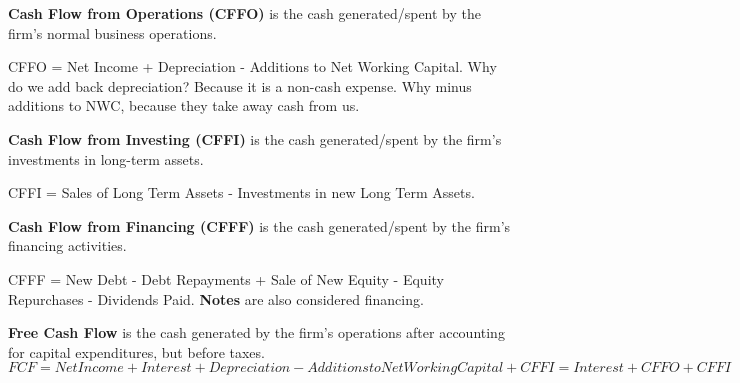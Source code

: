 \textbf{Cash Flow from Operations (CFFO)} is the cash generated/spent by the firm's normal business operations.
\begin{callout}
	CFFO = Net Income + Depreciation - Additions to Net Working Capital. Why do we add back depreciation? Because it is a non-cash expense. Why minus additions to NWC, because they take away cash from us.
\end{callout}

\textbf{Cash Flow from Investing (CFFI)} is the cash generated/spent by the firm's investments in long-term assets.
\begin{callout}
	CFFI = Sales of Long Term Assets - Investments in new Long Term Assets.
\end{callout}


\textbf{Cash Flow from Financing (CFFF)} is the cash generated/spent by the firm's financing activities.
\begin{callout}
	CFFF = New Debt - Debt Repayments + Sale of New Equity - Equity Repurchases - Dividends Paid. \textbf{Notes} are also considered financing.
\end{callout}

\textbf{Free Cash Flow} is the cash generated by the firm's operations after accounting for capital expenditures, but before taxes.
$FCF = Net Income + Interest + Depreciation - Additions to Net Working Capital + CFFI = Interest + CFFO + CFFI$

 
 
